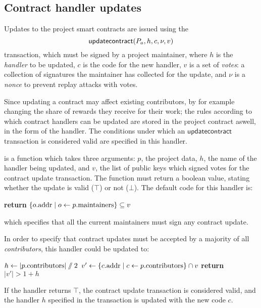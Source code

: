 \subsection{Contract handler updates}

Updates to the project smart contracts are issued using the
\[
    \mathsf{updatecontract}\lparen P_a, h, c, \nu, v\rparen
\]
transaction, which must be signed by a project maintainer, where $h$ is the
\emph{handler} to be updated, $c$ is the code for the new handler, $v$ is a set
of \emph{votes}: a collection of signatures the maintainer has collected for the
update, and $\nu$ is a \emph{nonce} to prevent replay attacks with votes.

Since updating a contract may affect existing contributors, by for example
changing the share of rewards they receive for their work; the rules according
to which contract handlers can be updated are stored in the project contract
aswell, in the form of the  handler.  The
conditions under which an $\mathsf{updatecontract}$ transaction is considered
valid are specified in this handler.

 is a function which takes three arguments: $p$,
the project data, $h$, the name of the handler being updated, and $v$, the list
of public keys which signed votes for the contract update transaction. The
function must return a boolean value, stating whether the update is valid ($\top$)
or not ($\bot$). The default code for this handler is:
\begin{algorithmic}[0]
        \State \textbf{return} $\{ o.{\mathrm{addr}} \mid o \gets p.{\mathrm{maintainers}} \} \subseteq v$
    \EndProcedure
\end{algorithmic}
which specifies that all the current maintainers must sign any contract update.

In order to specify that contract updates must be accepted by a majority of all
\emph{contributors}, this handler could be updated to:
\columnbreak
\begin{algorithmic}[0]
        \State $h \gets |p.{\mathrm{contributors}}| \sslash 2$
        \State $v' \gets \{ c.{\mathrm{addr}} \mid c \gets p.{\mathrm{contributors}} \} \cap v$
        \State \textbf{return} $|v'| > 1 + h$
    \EndProcedure
\end{algorithmic}
If the handler returns $\top$, the contract update transaction is considered
valid, and the handler $h$ specified in the transaction is updated with the new code
$c$.

